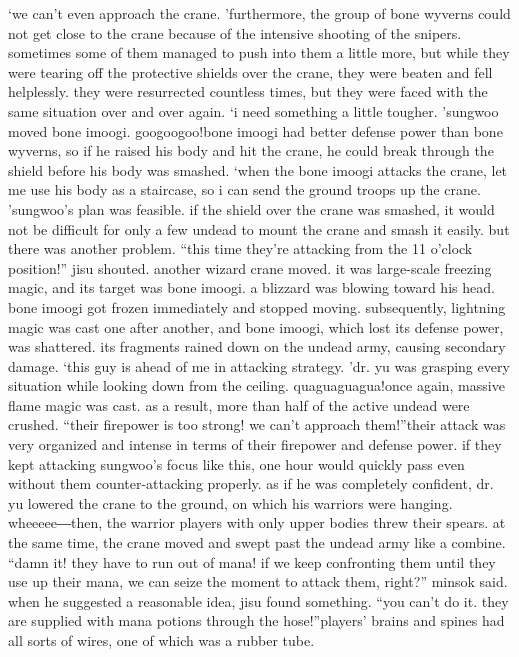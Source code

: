 ‘we can’t even approach the crane.
’furthermore, the group of bone wyverns could not get close to the crane because of the intensive shooting of the snipers.
 sometimes some of them managed to push into them a little more, but while they were tearing off the protective shields over the crane, they were beaten and fell helplessly.
they were resurrected countless times, but they were faced with the same situation over and over again.
‘i need something a little tougher.
’sungwoo moved bone imoogi.
googoogoo!bone imoogi had better defense power than bone wyverns, so if he raised his body and hit the crane, he could break through the shield before his body was smashed.
‘when the bone imoogi attacks the crane, let me use his body as a staircase, so i can send the ground troops up the crane.
’sungwoo’s plan was feasible.
 if the shield over the crane was smashed, it would not be difficult for only a few undead to mount the crane and smash it easily.
but there was another problem.
“this time they’re attacking from the 11 o’clock position!” jisu shouted.
another wizard crane moved.
 it was large-scale freezing magic, and its target was bone imoogi.
 a blizzard was blowing toward his head.
bone imoogi got frozen immediately and stopped moving.
 subsequently, lightning magic was cast one after another, and bone imoogi, which lost its defense power, was shattered.
 its fragments rained down on the undead army, causing secondary damage.
‘this guy is ahead of me in attacking strategy.
’dr.
 yu was grasping every situation while looking down from the ceiling.
quaguaguagua!once again, massive flame magic was cast.
 as a result, more than half of the active undead were crushed.
“their firepower is too strong! we can’t approach them!”their attack was very organized and intense in terms of their firepower and defense power.
if they kept attacking sungwoo’s focus like this, one hour would quickly pass even without them counter-attacking properly.
as if he was completely confident, dr.
 yu lowered the crane to the ground, on which his warriors were hanging.
wheeeee―then, the warrior players with only upper bodies threw their spears.
 at the same time, the crane moved and swept past the undead army like a combine.
“damn it! they have to run out of mana! if we keep confronting them until they use up their mana, we can seize the moment to attack them, right?” minsok said.
when he suggested a reasonable idea, jisu found something.
“you can’t do it.
 they are supplied with mana potions through the hose!”players’ brains and spines had all sorts of wires, one of which was a rubber tube.
